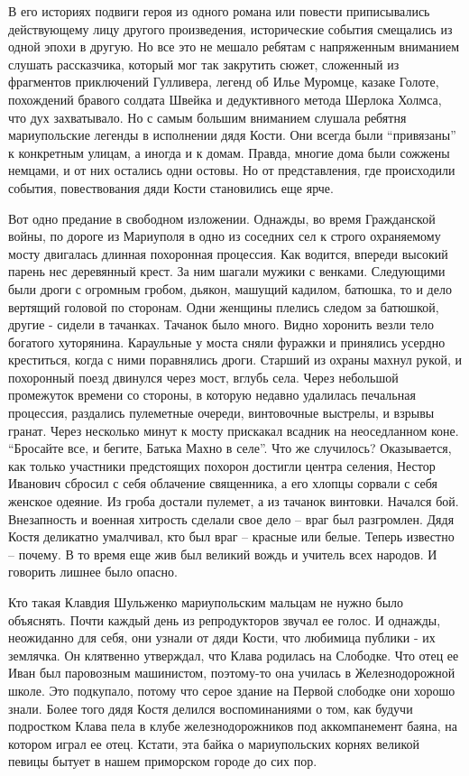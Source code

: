 В его историях подвиги героя из одного романа или повести приписывались
действующему лицу другого произведения, исторические события смещались из одной
эпохи в другую. Но все это не мешало ребятам с напряженным вниманием слушать
рассказчика, который мог так закрутить сюжет, сложенный из фрагментов
приключений Гулливера, легенд об Илье Муромце, казаке Голоте, похождений
бравого солдата Швейка и дедуктивного метода Шерлока Холмса, что дух
захватывало. Но с самым большим вниманием слушала ребятня мариупольские легенды
в исполнении дядя Кости. Они всегда были \enquote{привязаны} к конкретным улицам, а
иногда и к домам. Правда, многие дома были сожжены немцами, и от них остались
одни остовы. Но от представления, где происходили события, повествования дяди
Кости становились еще ярче.

Вот одно предание в свободном изложении.  Однажды, во время Гражданской войны,
по дороге из Мариуполя в одно из соседних сел к строго охраняемому мосту
двигалась длинная похоронная процессия. Как водится, впереди высокий парень нес
деревянный крест. За ним шагали мужики с венками. Следующими были дроги с
огромным гробом, дьякон, машущий кадилом, батюшка, то и дело вертящий головой
по сторонам. Одни женщины плелись следом за батюшкой, другие - сидели в
тачанках. Тачанок было много. Видно хоронить везли тело богатого хуторянина.
Караульные у моста сняли фуражки и принялись усердно креститься, когда с ними
поравнялись дроги. Старший из охраны махнул рукой, и похоронный поезд двинулся
через мост, вглубь села. Через небольшой промежуток времени со стороны, в
которую недавно удалилась печальная процессия, раздались пулеметные очереди,
винтовочные выстрелы, и взрывы гранат. Через несколько минут к мосту прискакал
всадник на неоседланном коне. \enquote{Бросайте все, и бегите, Батька Махно в селе}.
Что же случилось? Оказывается, как только участники предстоящих похорон
достигли центра селения, Нестор Иванович сбросил с себя облачение священника, а
его хлопцы сорвали с себя женское одеяние. Из гроба достали пулемет, а из
тачанок винтовки. Начался бой. Внезапность и военная хитрость сделали свое дело
– враг был разгромлен. Дядя Костя деликатно умалчивал, кто был враг – красные
или белые. Теперь известно – почему. В то время еще жив был великий вождь и
учитель всех народов. И говорить лишнее было опасно.

Кто такая Клавдия Шульженко мариупольским мальцам не нужно было объяснять.
Почти каждый день из репродукторов звучал ее голос. И однажды, неожиданно для
себя, они узнали от дяди Кости, что любимица публики - их землячка. Он
клятвенно утверждал, что Клава родилась на Слободке. Что отец ее Иван был
паровозным машинистом, поэтому-то она училась в Железнодорожной школе. Это
подкупало, потому что серое здание на Первой слободке они хорошо знали. Более
того дядя Костя делился воспоминаниями о том, как будучи подростком Клава пела
в клубе железнодорожников под аккомпанемент баяна, на котором играл ее отец.
Кстати, эта байка о мариупольских корнях великой певицы бытует в нашем
приморском городе до сих пор.

